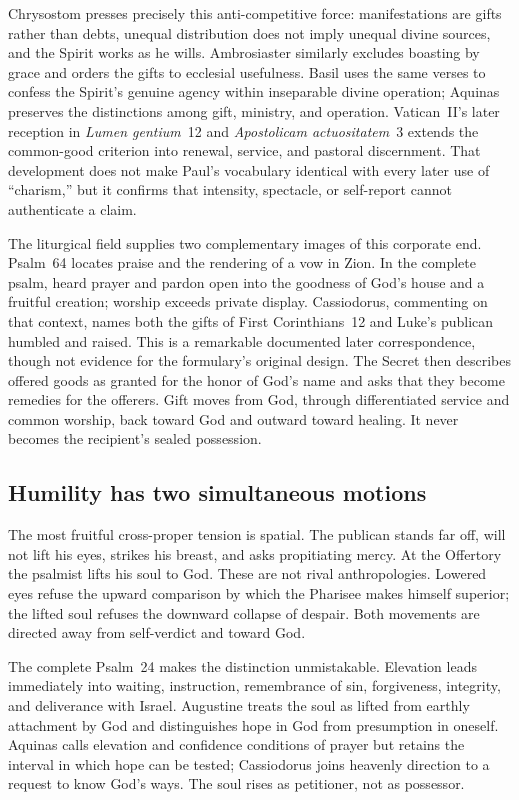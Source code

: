 Chrysostom presses precisely this anti-competitive force: manifestations are
gifts rather than debts, unequal distribution does not imply unequal divine
sources, and the Spirit works as he wills.  Ambrosiaster similarly excludes
boasting by grace and orders the gifts to ecclesial usefulness.  Basil uses
the same verses to confess the Spirit's genuine agency within inseparable
divine operation; Aquinas preserves the distinctions among gift, ministry,
and operation.  Vatican~II's later reception in \emph{Lumen gentium}~12 and
\emph{Apostolicam actuositatem}~3 extends the common-good criterion into
renewal, service, and pastoral discernment.  That development does not make
Paul's vocabulary identical with every later use of ``charism,'' but it
confirms that intensity, spectacle, or self-report cannot authenticate a
claim.

The liturgical field supplies two complementary images of this corporate end.
Psalm~64 locates praise and the rendering of a vow in Zion.  In the complete
psalm, heard prayer and pardon open into the goodness of God's house and a
fruitful creation; worship exceeds private display.  Cassiodorus, commenting
on that context, names both the gifts of First Corinthians~12 and Luke's
publican humbled and raised.  This is a remarkable documented later
correspondence, though not evidence for the formulary's original design.
The Secret then describes offered goods as granted for the honor of God's
name and asks that they become remedies for the offerers.  Gift moves from
God, through differentiated service and common worship, back toward God and
outward toward healing.  It never becomes the recipient's sealed possession.

\subsection*{Humility has two simultaneous motions}

The most fruitful cross-proper tension is spatial.  The publican stands far
off, will not lift his eyes, strikes his breast, and asks propitiating mercy.
At the Offertory the psalmist lifts his soul to God.  These are not rival
anthropologies.  Lowered eyes refuse the upward comparison by which the
Pharisee makes himself superior; the lifted soul refuses the downward collapse
of despair.  Both movements are directed away from self-verdict and toward
God.

The complete Psalm~24 makes the distinction unmistakable.  Elevation leads
immediately into waiting, instruction, remembrance of sin, forgiveness,
integrity, and deliverance with Israel.  Augustine treats the soul as lifted
from earthly attachment by God and distinguishes hope in God from presumption
in oneself.  Aquinas calls elevation and confidence conditions of prayer but
retains the interval in which hope can be tested; Cassiodorus joins heavenly
direction to a request to know God's ways.  The soul rises as petitioner, not
as possessor.

